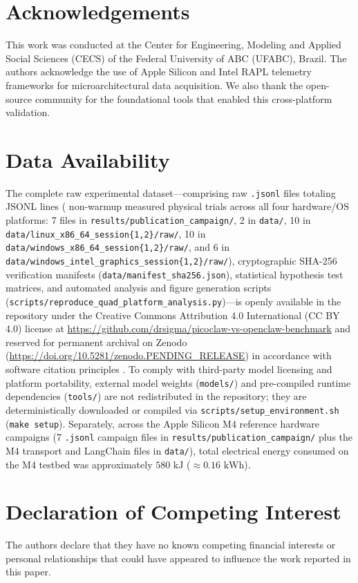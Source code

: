 \documentclass[11pt,a4paper]{article}
\begin{document}
\section*{Acknowledgements}
This work was conducted at the Center for Engineering, Modeling and Applied Social Sciences (CECS) of the Federal University of ABC (UFABC), Brazil. The authors acknowledge the use of Apple Silicon and Intel RAPL telemetry frameworks for microarchitectural data acquisition. We also thank the open-source community for the foundational tools that enabled this cross-platform validation.

\section*{Data Availability}
The complete raw experimental dataset---comprising \TotalRawDatasets{} raw \texttt{.jsonl} files totaling \TotalJsonlLines{} JSONL lines (\TotalMeasuredTrials{} non-warmup measured physical trials across all four hardware/OS platforms: 7 files in \texttt{results/publication\_campaign/}, 2 in \texttt{data/}, 10 in \texttt{data/linux\_x86\_64\_session\{1,2\}/raw/}, 10 in \texttt{data/windows\_x86\_64\_session\{1,2\}/raw/}, and 6 in \texttt{data/windows\_intel\_graphics\_session\{1,2\}/raw/}), cryptographic SHA-256 verification manifests (\texttt{data/manifest\_sha256.json}), statistical hypothesis test matrices, and automated analysis and figure generation scripts (\texttt{scripts/reproduce\_quad\_platform\_analysis.py})---is openly available in the repository under the Creative Commons Attribution 4.0 International (CC BY 4.0) license at \url{https://github.com/drsigma/picoclaw-vs-openclaw-benchmark} and reserved for permanent archival on Zenodo (\url{https://doi.org/10.5281/zenodo.PENDING_RELEASE}) in accordance with software citation principles \cite{smith2016software}. To comply with third-party model licensing and platform portability, external model weights (\texttt{models/}) and pre-compiled runtime dependencies (\texttt{tools/}) are not redistributed in the repository; they are deterministically downloaded or compiled via \texttt{scripts/setup\_environment.sh} (\texttt{make setup}). Separately, across the Apple Silicon M4 reference hardware campaigns (7 \texttt{.jsonl} campaign files in \texttt{results/publication\_campaign/} plus the M4 transport and LangChain files in \texttt{data/}), total electrical energy consumed on the M4 testbed was approximately $580\text{ kJ}$ ($\approx 0.16\text{ kWh}$).

\section*{Declaration of Competing Interest}
The authors declare that they have no known competing financial interests or personal relationships that could have appeared to influence the work reported in this paper.



\end{document}
